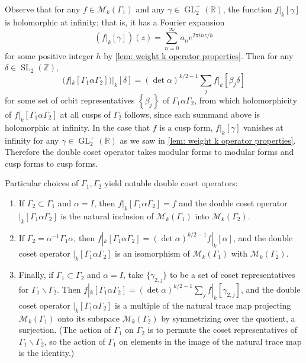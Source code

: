 \documentclass[10pt,leqno,twoside]{article}
\theoremstyle{plain}
\theoremstyle{definition}
\numberwithin{equation}{section}
\numberwithin{lem}{section}
\newcommand{\cbr}[1]{\left\{#1\right\}}
\DeclareMathOperator{\GL}{GL}
\DeclareMathOperator{\SL}{SL}
\newcommand{\slz}{\SL_2(\mathbb{Z})}
\newcommand{\glrp}{\GL_2^+(\mathbb{R})}
\begin{document}
Observe that for any $f\in\mathcal M_k(\varGamma_1)$ and any $\gamma\in\glrp$, the function $f|_k[\gamma]$ is holomorphic at infinity; that is, it has a Fourier expansion 
\[(f|_k[\gamma])(z) = \sum_{n=0}^\infty a_ne^{2\pi i n z/h}\] for some positive integer $h$ by \cref{lem: weight k operator properties}. Then for any $\delta\in\slz$, 
\[(f|_k[\varGamma_1\alpha\varGamma_2])|_k[\delta] = (\det\alpha)^{k/2-1}\sum_{j}f|_k[\beta_j\delta]\]
for some set of orbit representatives $\cbr{\beta_j}$ of $\varGamma_1\alpha\varGamma_2$, from which holomorphicity of $f|_k[\varGamma_1\alpha\varGamma_2]$ at all cusps of $\varGamma_2$ follows, since each summand above is holomorphic at infinity. In the case that $f$ is a cusp form, $f|_k[\gamma]$ vanishes at infinity for any $\gamma\in\glrp$ as we saw in \cref{lem: weight k operator properties}. Therefore the double coset operator takes modular forms to modular forms and cusp forms to cusp forms.

Particular choices of $\varGamma_1,\varGamma_2$ yield notable double coset operators:
\begin{enumerate}[label=(\arabic*)]
    \item If $\varGamma_2\subset \varGamma_1$ and $\alpha = I$, then $f|_k[\varGamma_1\alpha\varGamma_2] = f$ and the double coset operator $|_k[\varGamma_1\alpha\varGamma_2]$ is the natural inclusion of $\mathcal M_k(\varGamma_1)$ into $\mathcal M_k(\varGamma_2)$.
    \item If $\varGamma_2 = \alpha^{-1}\varGamma_1\alpha$, then $f|_k[\varGamma_1\alpha\varGamma_2] = (\det\alpha)^{k/2-1}f|_k[\alpha]$, and the double coset operator $|_k[\varGamma_1\alpha\varGamma_2]$ is an isomorphism of $\mathcal M_k(\varGamma_1)$ with $\mathcal M_k(\varGamma_2)$.
    \item Finally, if $\varGamma_1\subset\varGamma_2$ and $\alpha = I$, take $\{\gamma_{2,j}\}$ to be a set of coset representatives for $\varGamma_1\backslash \varGamma_2$. Then $f|_k[\varGamma_1\alpha\varGamma_2] = (\det\alpha)^{k/2-1}\sum_j f|_k[\gamma_{2,j}]$, and the double coset operator $|_k[\varGamma_1\alpha\varGamma_2]$ is a multiple of the natural trace map projecting $\mathcal M_k(\varGamma_1)$ onto its subspace $\mathcal M_k(\varGamma_2)$ by symmetrizing over the quotient, a surjection. (The action of $\varGamma_1$ on $\varGamma_2$ is to permute the coset representatives of $\varGamma_1\backslash\varGamma_2$, so the action of $\varGamma_1$ on elements in the image of the natural trace map is the identity.)
\end{enumerate}
\end{document}
